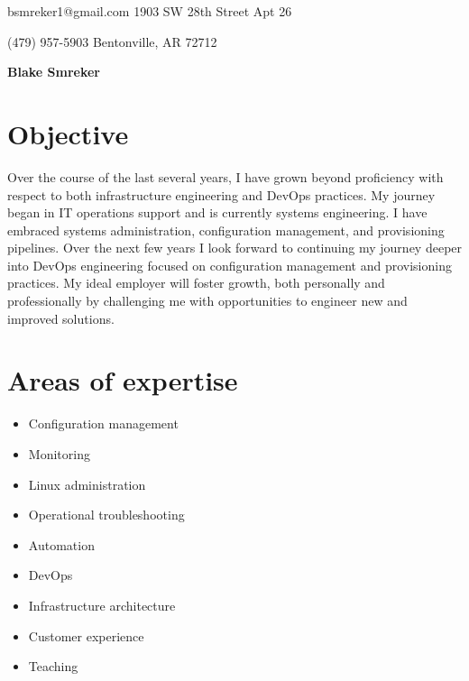 \documentclass[10pt]{article}
\begin{document}
{\noindent bsmreker1@gmail.com \hfill 1903 SW 28th Street Apt 26}

{\noindent (479) 957-5903 \hfill Bentonville, AR 72712}
\begin{center}
    {\bfseries \huge Blake Smreker} \\
\end{center}
\vspace{-1em}

\section*{Objective}
Over the course of the last several years, I have grown beyond proficiency with respect to both infrastructure engineering and DevOps practices. 
My journey began in IT operations support and is currently systems engineering. 
I have embraced systems administration, configuration management, and provisioning pipelines. 
Over the next few years I look forward to continuing my journey deeper into DevOps engineering focused on configuration management and provisioning practices. 
My ideal employer will foster growth, both personally and professionally by challenging me with opportunities to engineer new and improved solutions.

\section*{Areas of expertise}
\vspace{-0.75em}
\begin{multicols}{3}
    \begin{itemize}
        \item Configuration management
        \item Monitoring
        \item Linux administration
        \item Operational troubleshooting
        \item Automation
        \item DevOps
        \item Infrastructure architecture
        \item Customer experience
        \item Teaching
    \end{itemize}
\end{multicols}
\end{document}
